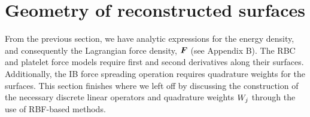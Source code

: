 



\section{Geometry of reconstructed surfaces}\label{sec:rbfs}

From the previous section, we have analytic expressions for the energy density, and consequently the Lagrangian force density,
$\boldsymbol{F}$ (see Appendix B). The RBC and platelet force models require first and second derivatives along their
surfaces. Additionally, the IB force spreading operation requires quadrature weights for
the surfaces. This section finishes where we left off by discussing the construction of
the necessary discrete linear operators and quadrature weights $\weight[j]$ through the
use of RBF-based methods.




